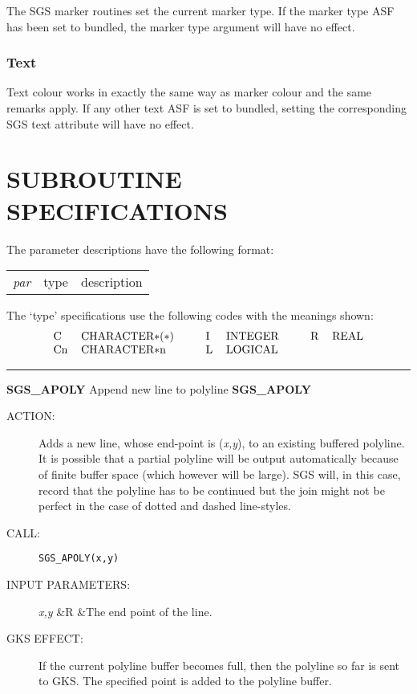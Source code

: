 The SGS marker routines set the current marker type.
If the marker type ASF has been set to bundled, the marker type argument will
have no effect.

\subsubsection* {Text}

Text colour works in exactly the same way as marker colour and the same remarks
apply.
If any other text ASF is set to bundled, setting the corresponding SGS text
attribute will have no effect.

\section {SUBROUTINE SPECIFICATIONS}\label{app-subroutines}

The parameter descriptions have the following format:

\begin{tabular}{lll}
\em par&type&description
\end{tabular}

The `type' specifications use the following codes with the meanings shown:
\[\begin{tabular}{ll@{\hspace{1cm}}ll@{\hspace{1cm}}ll}
C&CHARACTER$\ast$($\ast$)&I&INTEGER&R&REAL\\
Cn&CHARACTER$\ast$n&L&LOGICAL
\end{tabular}\]

\rule{\textwidth}{0.3mm}
{\Large {\bf SGS\_APOLY} \hfill Append new line to polyline \hfill {\bf SGS\_APOLY}}
\begin{description}
\item [ACTION:]
Adds a new line, whose end-point is ({\em x,y}), to an existing buffered
polyline.
It is possible that a partial polyline will be output automatically because of
finite buffer space (which however will be large).
SGS will, in this case, record that the polyline has to be continued but the
join might not be perfect in the case of dotted and dashed line-styles.
\item [CALL:]
{\tt SGS\_APOLY(x,y)}
\item [INPUT PARAMETERS:]
\begin{params}
{\em x,y}  &R  &The end point of the line.
\end{params}
\item [GKS EFFECT:]
If the current polyline buffer becomes full, then the polyline so far is sent to
GKS.
The specified point is added to the polyline buffer.
\end{description}
\goodbreak

